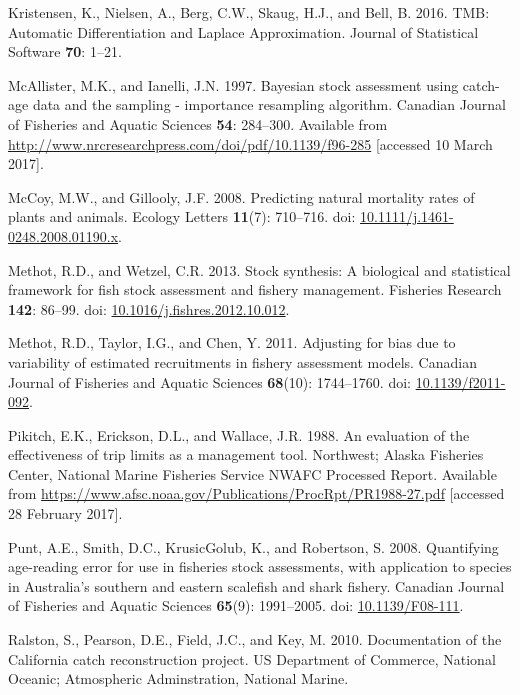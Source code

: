 \documentclass[12pt,]{article}
\begin{document}
\hypertarget{ref-kristensen_tmb:_2016}{}
Kristensen, K., Nielsen, A., Berg, C.W., Skaug, H.J., and Bell, B. 2016.
TMB: Automatic Differentiation and Laplace Approximation. Journal of
Statistical Software \textbf{70}: 1--21.

\hypertarget{ref-mcallister_bayesian_1997}{}
McAllister, M.K., and Ianelli, J.N. 1997. Bayesian stock assessment
using catch-age data and the sampling - importance resampling algorithm.
Canadian Journal of Fisheries and Aquatic Sciences \textbf{54}:
284--300. Available from
\url{http://www.nrcresearchpress.com/doi/pdf/10.1139/f96-285}
{[}accessed 10 March 2017{]}.

\hypertarget{ref-mccoy_predicting_2008}{}
McCoy, M.W., and Gillooly, J.F. 2008. Predicting natural mortality rates
of plants and animals. Ecology Letters \textbf{11}(7): 710--716. doi:
\href{https://doi.org/10.1111/j.1461-0248.2008.01190.x}{10.1111/j.1461-0248.2008.01190.x}.

\hypertarget{ref-methot_stock_2013}{}
Methot, R.D., and Wetzel, C.R. 2013. Stock synthesis: A biological and
statistical framework for fish stock assessment and fishery management.
Fisheries Research \textbf{142}: 86--99. doi:
\href{https://doi.org/10.1016/j.fishres.2012.10.012}{10.1016/j.fishres.2012.10.012}.

\hypertarget{ref-methot_adjusting_2011}{}
Methot, R.D., Taylor, I.G., and Chen, Y. 2011. Adjusting for bias due to
variability of estimated recruitments in fishery assessment models.
Canadian Journal of Fisheries and Aquatic Sciences \textbf{68}(10):
1744--1760. doi:
\href{https://doi.org/10.1139/f2011-092}{10.1139/f2011-092}.

\hypertarget{ref-pikitch_evaluation_1988}{}
Pikitch, E.K., Erickson, D.L., and Wallace, J.R. 1988. An evaluation of
the effectiveness of trip limits as a management tool. Northwest; Alaska
Fisheries Center, National Marine Fisheries Service NWAFC Processed
Report. Available from
\url{https://www.afsc.noaa.gov/Publications/ProcRpt/PR1988-27.pdf}
{[}accessed 28 February 2017{]}.

\hypertarget{ref-punt_quantifying_2008}{}
Punt, A.E., Smith, D.C., KrusicGolub, K., and Robertson, S. 2008.
Quantifying age-reading error for use in fisheries stock assessments,
with application to species in Australia's southern and eastern
scalefish and shark fishery. Canadian Journal of Fisheries and Aquatic
Sciences \textbf{65}(9): 1991--2005. doi:
\href{https://doi.org/10.1139/F08-111}{10.1139/F08-111}.

\hypertarget{ref-ralston_documentation_2010}{}
Ralston, S., Pearson, D.E., Field, J.C., and Key, M. 2010. Documentation
of the California catch reconstruction project. US Department of
Commerce, National Oceanic; Atmospheric Adminstration, National Marine.
\end{document}
